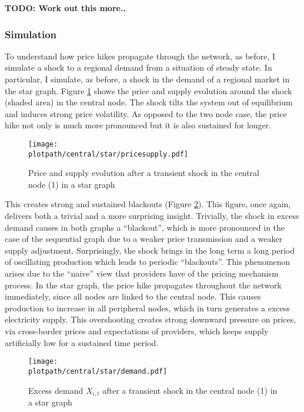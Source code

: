\textbf{TODO: Work out this more..}

\subsubsection{Simulation}

To understand how price hikes propagate through the network, as before, I simulate a shock to a regional demand from a situation of steady state. In particular, I simulate, as before, a shock in the demand of a regional market in the star graph. Figure \ref{fig:transshockcen_star} shows the price and supply evolution around the shock (shaded area) in the central node. The shock tilts the system out of equilibrium and induces strong price volatility. As opposed to the two node case, the price hike not only is much more pronounced but it is also sustained for longer.

\begin{figure}[H]
    \centering
    \texttt{[image: \\plotpath/central/star/pricesupply.pdf]}
    \caption{Price and supply evolution after a transient shock in the central node (1) in a star graph} \label{fig:transshockcen_star}
\end{figure}

This creates strong and sustained blackouts (Figure \ref{fig:demandtransshockcen_star}). This figure, once again, delivers both a trivial and a more surprising insight. Trivially, the shock in excess demand causes in both graphs a ``blackout'', which is more pronounced in the case of the sequential graph due to a weaker price transmission and a weaker supply adjustment. Surprisingly, the shock brings in the long term a long period of oscillating production which leads to periodic ``blackouts''. This phenomenon arises due to the ``naive'' view that providers have of the pricing mechanism process. In the star graph, the price hike propagates throughout the network immediately, since all nodes are linked to the central node. This causes production to increase in all peripheral nodes, which in turn generates a excess electricity supply. This overshooting creates strong downward pressure on prices, via cross-border prices and expectations of providers, which keeps supply artificially low for a sustained time period.

\begin{figure}[H]
    \centering
    \texttt{[image: \\plotpath/central/star/demand.pdf]}
    \caption{Excess demand $X_{i, t}$ after a transient shock in the central node (1) in a star graph} \label{fig:demandtransshockcen_star}
\end{figure}

